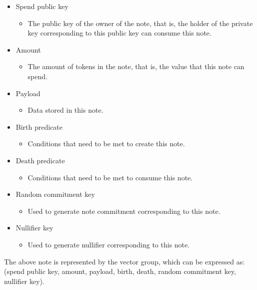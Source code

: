 \begin{itemize}
    \item Spend public key
        \begin{itemize}
            \item The public key of the owner of the note, that is, the holder of the private key corresponding to this public key can consume this note.
        \end{itemize}
    \item Amount
        \begin{itemize}
            \item The amount of tokens in the note, that is, the value that this note can spend.
        \end{itemize}
    \item Payload
        \begin{itemize}
            \item Data stored in this note.
        \end{itemize}
    \item Birth predicate
        \begin{itemize}
            \item Conditions that need to be met to create this note.
        \end{itemize}
    \item Death predicate
        \begin{itemize}
            \item Conditions that need to be met to consume this note.
        \end{itemize}
    \item Random commitment key
        \begin{itemize}
            \item Used to generate note commitment corresponding to this note.
        \end{itemize}
    \item Nullifier key
        \begin{itemize}
            \item Used to generate nullifier corresponding to this note.
        \end{itemize}
\end{itemize}

The above note is represented by the vector group, which can be expressed as: 
(spend public key, amount, payload, birth, death, random commitment key, nullifier key).